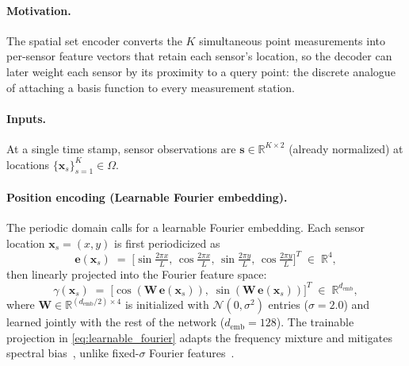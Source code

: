 \paragraph{Motivation.}
The spatial set encoder converts the $K$ simultaneous point measurements into per-sensor feature vectors that retain each sensor's location, so the decoder can later weight each sensor by its proximity to a query point: the discrete analogue of attaching a basis function to every measurement station.

\paragraph{Inputs.}
At a single time stamp, sensor observations are $\mathbf{s} \in \mathbb{R}^{K\times 2}$ (already normalized) at locations $\{\mathbf{x}_s\}_{s=1}^K \in \Omega$.

\paragraph{Position encoding (Learnable Fourier embedding).}
The periodic domain calls for a learnable Fourier embedding. Each sensor location $\mathbf{x}_s = (x, y)$ is first periodicized as
\begin{equation*}
    \mathbf{e}(\mathbf{x}_s) \;=\; \big[\sin\!\tfrac{2\pi x}{L},\,\cos\!\tfrac{2\pi x}{L},\,\sin\!\tfrac{2\pi y}{L},\,\cos\!\tfrac{2\pi y}{L}\big]^T \;\in\;\mathbb{R}^4,
\end{equation*}
then linearly projected into the Fourier feature space:
\begin{equation}
    \label{eq:learnable_fourier}
    \gamma(\mathbf{x}_s) \;=\; \big[\cos(\mathbf{W}\,\mathbf{e}(\mathbf{x}_s)),\;\sin(\mathbf{W}\,\mathbf{e}(\mathbf{x}_s))\big]^T \;\in\;\mathbb{R}^{d_{\text{emb}}},
\end{equation}
where $\mathbf{W}\in\mathbb{R}^{(d_{\text{emb}}/2)\times 4}$ is initialized with $\mathcal{N}(0, \sigma^2)$ entries ($\sigma=2.0$) and learned jointly with the rest of the network ($d_{\text{emb}} = 128$). The trainable projection in \eqref{eq:learnable_fourier} adapts the frequency mixture and mitigates spectral bias~\cite{Rahaman2019Spectral}, unlike fixed-$\sigma$ Fourier features~\cite{tancik2020fourierfeaturesletnetworks}.


